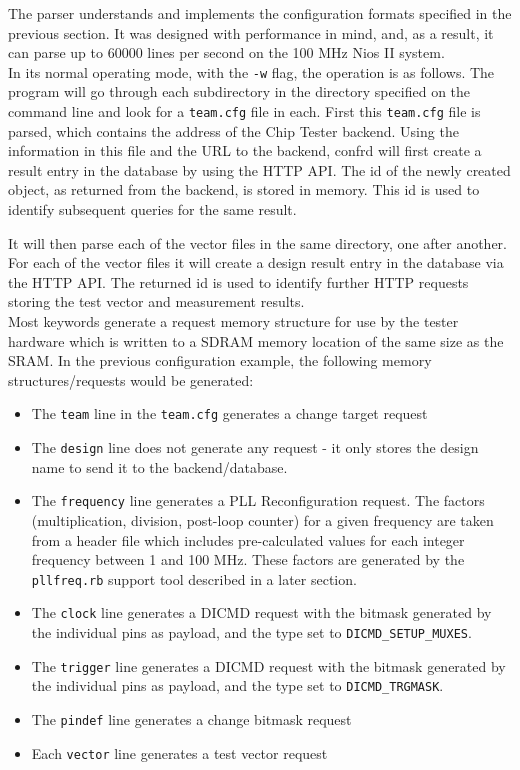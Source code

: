 The parser understands and implements the configuration formats specified in the previous
section. It was designed with performance in mind, and, as a result, it can parse up to
60000 lines per second on the 100 MHz Nios II system.
\\

In its normal operating mode, with the \texttt{-w} flag, the operation is as follows.
The program will go through each subdirectory in the directory specified on the command
line and look for a \texttt{team.cfg} file in each. First this \texttt{team.cfg} file
is parsed, which contains the address of the Chip Tester backend. Using the information
in this file and the URL to the backend, confrd will first create a result entry in
the database by using the HTTP API. The id of the newly created object, as returned
from the backend, is stored in memory. This id is used to identify subsequent queries
for the same result.

It will then parse each of the vector files in the same directory, one after another.
For each of the vector files it will create a design result entry in the database via
the HTTP API. The returned id is used to identify further HTTP requests storing the
test vector and measurement results.
\\

Most keywords generate a request memory structure for use by the tester hardware
which is written to a SDRAM memory location
of the same size as the SRAM. In the previous configuration example, the following
memory structures/requests would be generated:
\begin{itemize}
 \item The \texttt{team} line in the \texttt{team.cfg} generates a change target request
 \item The \texttt{design} line does not generate any request - it only stores the design name to send it to the backend/database.
 \item The \texttt{frequency} line generates a PLL Reconfiguration request. The factors (multiplication, division, post-loop counter) for a given frequency are taken from a header file
which includes pre-calculated values for each integer frequency between 1 and 100 MHz. These factors are generated by the \texttt{pllfreq.rb} support tool described in a later section.
 \item The \texttt{clock} line generates a DICMD request with the bitmask generated by the individual pins as payload, and the type set to \texttt{DICMD\_SETUP\_MUXES}.
 \item The \texttt{trigger} line generates a DICMD request with the bitmask generated by the individual pins as payload, and the type set to \texttt{DICMD\_TRGMASK}.
 \item The \texttt{pindef} line generates a change bitmask request
 \item Each \texttt{vector} line generates a test vector request
\end{itemize}


